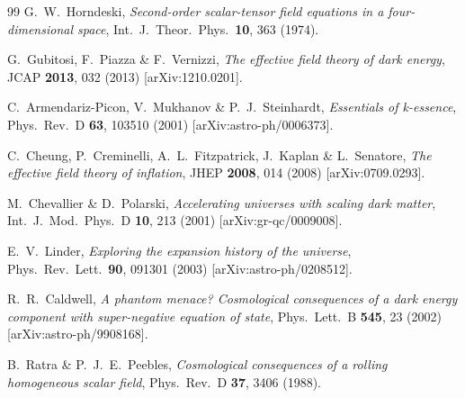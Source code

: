 \documentclass[12pt,a4paper]{article}
\begin{document}
\begin{thebibliography}{99}
G.~W.~Horndeski,
\emph{Second-order scalar-tensor field equations in a four-dimensional space},
Int.\ J.\ Theor.\ Phys.\ \textbf{10}, 363 (1974).

G.~Gubitosi, F.~Piazza \& F.~Vernizzi,
\emph{The effective field theory of dark energy},
JCAP \textbf{2013}, 032 (2013) [arXiv:1210.0201].

C.~Armendariz-Picon, V.~Mukhanov \& P.~J.~Steinhardt,
\emph{Essentials of k-essence},
Phys.\ Rev.\ D \textbf{63}, 103510 (2001) [arXiv:astro-ph/0006373].

C.~Cheung, P.~Creminelli, A.~L.~Fitzpatrick, J.~Kaplan \& L.~Senatore,
\emph{The effective field theory of inflation},
JHEP \textbf{2008}, 014 (2008) [arXiv:0709.0293].

M.~Chevallier \& D.~Polarski,
\emph{Accelerating universes with scaling dark matter},
Int.\ J.\ Mod.\ Phys.\ D \textbf{10}, 213 (2001) [arXiv:gr-qc/0009008].

E.~V.~Linder,
\emph{Exploring the expansion history of the universe},
Phys.\ Rev.\ Lett.\ \textbf{90}, 091301 (2003) [arXiv:astro-ph/0208512].

R.~R.~Caldwell,
\emph{A phantom menace? Cosmological consequences of a dark energy component with
super-negative equation of state},
Phys.\ Lett.\ B \textbf{545}, 23 (2002) [arXiv:astro-ph/9908168].

B.~Ratra \& P.~J.~E.~Peebles,
\emph{Cosmological consequences of a rolling homogeneous scalar field},
Phys.\ Rev.\ D \textbf{37}, 3406 (1988).

\end{thebibliography}
\end{document}
